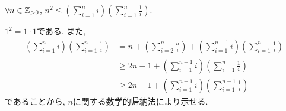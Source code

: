 \begin{prop}
  \label{p:20230824}
  $\forall n\in\mathbb{Z}_{>0}$,
  $n^2\leq \left(\sum_{i=1}^{n}i\right)\left(\sum_{i=1}^{n}\frac{1}{i}\right)$.
\end{prop}
\begin{proof**}
  $1^2=1\cdot 1$である.
  また, 
  \begin{align*}
    \left(\sum_{i=1}^{n}i\right)\left(\sum_{i=1}^{n}\frac{1}{i}\right)
    &=
    n+\left(\sum_{i=2}^{n}\frac{n}{i}\right)
    +\left(\sum_{i=1}^{n-1}i\right)\left(\sum_{i=1}^{n}\frac{1}{i}\right)
    \\
    &\geq
    2n-1+
    \left(\sum_{i=1}^{n-1}i\right)\left(\sum_{i=1}^{n}\frac{1}{i}\right)\\
    &\geq
    2n-1+
    \left(\sum_{i=1}^{n-1}i\right)\left(\sum_{i=1}^{n-1}\frac{1}{i}\right)
  \end{align*}
  であることから,
  $n$に関する数学的帰納法により示せる.
\end{proof**}

